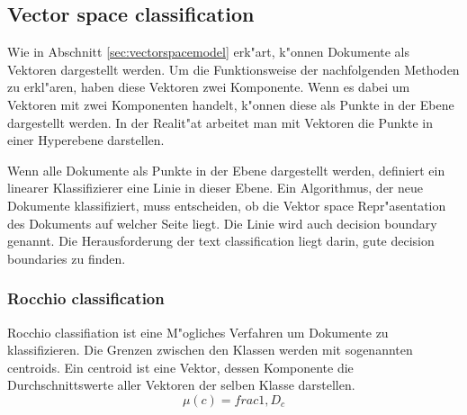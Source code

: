 \documentclass[12pt,a4paper,twoside]{article}
\begin{document}
\subsection{Vector space classification}
\label{sec:vectorclassification}

Wie in Abschnitt \ref{sec:vectorspacemodel} erk"art, k"onnen Dokumente als Vektoren dargestellt werden. Um die Funktionsweise der nachfolgenden Methoden zu erkl"aren, haben diese Vektoren zwei Komponente. Wenn es dabei um Vektoren mit zwei Komponenten handelt, k"onnen diese als Punkte in der Ebene dargestellt werden. In der Realit"at arbeitet man mit Vektoren die Punkte in einer Hyperebene darstellen.

Wenn alle Dokumente als Punkte in der Ebene dargestellt werden, de\-finiert ein linearer Klassifizierer eine Linie in dieser Ebene. Ein Algorithmus, der neue Dokumente klassifiziert, muss entscheiden, ob die Vektor space Repr"a\-sentation des Dokuments auf welcher Seite liegt. Die Linie wird auch decision boundary genannt. Die Herausforderung der text classification liegt darin, gute decision boundaries zu finden.

\subsubsection{Rocchio classification}
\label{sec:rocchio}

Rocchio classifiation ist eine M"ogliches Verfahren um Dokumente zu klassifizieren. Die Grenzen zwischen den Klassen werden mit sogenannten centroids. Ein centroid ist eine Vektor, dessen Komponente die Durchschnitts\-werte aller Vektoren der selben Klasse darstellen.
\[
\mu(c) = frac{1,D_c}
\]
\end{document}
